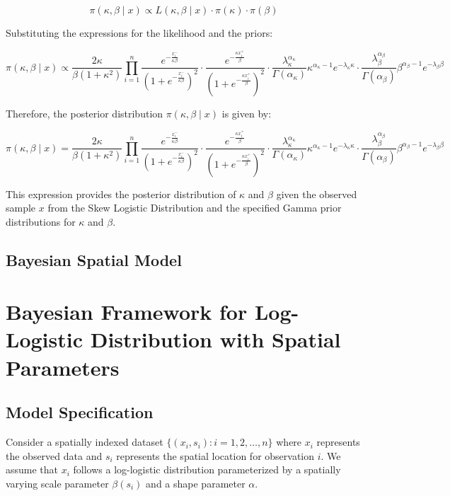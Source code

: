 \documentclass{article}
\begin{document}
\[ \pi(\kappa, \beta \mid x) \propto L(\kappa, \beta \mid x) \cdot \pi(\kappa) \cdot \pi(\beta) \]

Substituting the expressions for the likelihood and the priors:

\[ \pi(\kappa, \beta \mid x) \propto \frac{2\kappa}{\beta(1 + \kappa^2)} \prod_{i=1}^{n} \frac{e^{-\frac{x^-_i}{\kappa \beta}}}{(1 + e^{-\frac{x^-_i}{\kappa \beta}})^2} \cdot \frac{e^{-\frac{\kappa x^+_i}{\beta}}}{(1 + e^{-\frac{\kappa x^+_i}{\beta}})^2} \cdot \frac{\lambda_{\kappa}^{\alpha_{\kappa}}}{\Gamma(\alpha_{\kappa})} \kappa^{\alpha_{\kappa} - 1} e^{-\lambda_{\kappa} \kappa} \cdot \frac{\lambda_{\beta}^{\alpha_{\beta}}}{\Gamma(\alpha_{\beta})} \beta^{\alpha_{\beta} - 1} e^{-\lambda_{\beta} \beta} \]

Therefore, the posterior distribution \( \pi(\kappa, \beta \mid x) \) is given by:

\[ \pi(\kappa, \beta \mid x) = \frac{2\kappa}{\beta(1 + \kappa^2)} \prod_{i=1}^{n} \frac{e^{-\frac{x^-_i}{\kappa \beta}}}{(1 + e^{-\frac{x^-_i}{\kappa \beta}})^2} \cdot \frac{e^{-\frac{\kappa x^+_i}{\beta}}}{(1 + e^{-\frac{\kappa x^+_i}{\beta}})^2} \cdot \frac{\lambda_{\kappa}^{\alpha_{\kappa}}}{\Gamma(\alpha_{\kappa})} \kappa^{\alpha_{\kappa} - 1} e^{-\lambda_{\kappa} \kappa} \cdot \frac{\lambda_{\beta}^{\alpha_{\beta}}}{\Gamma(\alpha_{\beta})} \beta^{\alpha_{\beta} - 1} e^{-\lambda_{\beta} \beta} \]

This expression provides the posterior distribution of \( \kappa \) and \( \beta \) given the observed sample \( x \) from the Skew Logistic Distribution and the specified Gamma prior distributions for \( \kappa \) and \( \beta \).

\subsection{Bayesian Spatial Model}



\section*{Bayesian Framework for Log-Logistic Distribution with Spatial Parameters}

\subsection*{Model Specification}

Consider a spatially indexed dataset \( \{(x_i, s_i) : i = 1, 2, \ldots, n\} \) where \( x_i \) represents the observed data and \( s_i \) represents the spatial location for observation \( i \). We assume that \( x_i \) follows a log-logistic distribution parameterized by a spatially varying scale parameter \( \beta(s_i) \) and a shape parameter \( \alpha \).
\end{document}
